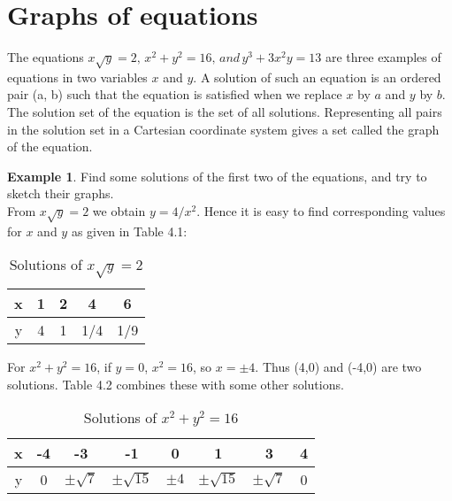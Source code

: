 \documentclass[10pt,a4paper]{book}
\theoremstyle{definition}\newtheorem{definition}{Definition}
\theoremstyle{definition}\newtheorem{fact}{Fact}
\theoremstyle{definition}\newtheorem{ex}{Ex.}
\theoremstyle{definition}\newtheorem{project}{Project}
\theoremstyle{definition}\newtheorem{problem}{Problem}
\theoremstyle{definition}\newtheorem{example}{Example}
\numberwithin{theorem}{chapter}
\numberwithin{corollary}{chapter}
\numberwithin{assumption}{chapter}
\numberwithin{definition}{chapter}
\numberwithin{prop}{chapter}
\numberwithin{notation}{chapter}
\numberwithin{problem}{chapter}
\numberwithin{example}{chapter}
\numberwithin{fact}{chapter}
\numberwithin{ex}{chapter}
\begin{document}
	\section{Graphs of equations}
	The equations $x\sqrt{y} = 2,\,x^2 + y^2 = 16,\,and\,y^3 + 3x^2y = 13$ are three examples of equations in two variables $x$ and $y$. A solution of such an equation is an ordered pair (a, b) such that the equation is satisfied when we replace $x$ by $a$ and $y$ by $b$. The solution set of the equation is the set of all solutions. Representing all pairs in the solution set in a Cartesian coordinate system gives a set called the graph of the equation.
	
	\begin{example}
		Find some solutions of the first two of the equations, and try to sketch their graphs.
		\\
		From $x\sqrt{y} = 2$ we obtain $y = 4/x^2$. Hence it is easy to find corresponding values for $x$ and $y$ as given in Table 4.1:
		\begin{table}[H]
			\centering
			\begin{tabular}{|c|c|c|c|c|}
				x & 1 & 2 & 4   & 6   \\
				\hline
				y & 4 & 1 & 1/4 & 1/9 
			\end{tabular}
			\caption{Solutions of $x\sqrt{y} = 2$}
		\end{table}
		
		For $x^2 + y^2 =16$, if $y=0$, $x^2=16$, so $x=\pm4$. Thus (4,0) and (-4,0) are two solutions. Table 4.2 combines these with some other solutions.
		\begin{table}[H]
			\centering
			\begin{tabular}{|c|c|c|c|c|c|c|c|}
				x & -4 & -3             & -1              & 0      & 1               & 3              & 4 \\
				\hline
				y & 0  & $\pm \sqrt{7}$ & $\pm \sqrt{15}$ & $\pm4$ & $\pm \sqrt{15}$ & $\pm \sqrt{7}$ & 0 
			\end{tabular}
			\caption{Solutions of $x^2 + y^2 =16$}
		\end{table}
	\end{example}
	
	
\end{document}
